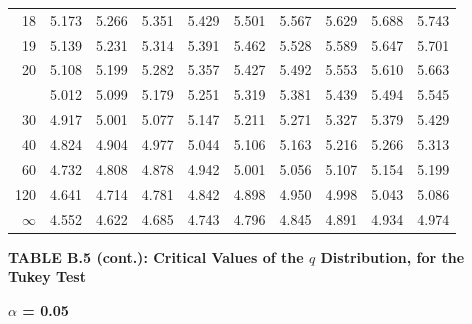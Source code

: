 \documentclass[10pt]{article}
\begin{document}
\begin{longtable}{@{}r!{\vrule width 0.8pt\hspace{0.55em}}rrrrrrrrr@{}}
18 & 5.173 & 5.266 & 5.351 & 5.429 & 5.501 & 5.567 & 5.629 & 5.688 & 5.743 \\
19 & 5.139 & 5.231 & 5.314 & 5.391 & 5.462 & 5.528 & 5.589 & 5.647 & 5.701 \\
20 & 5.108 & 5.199 & 5.282 & 5.357 & 5.427 & 5.492 & 5.553 & 5.610 & 5.663 \\
 & 5.012 & 5.099 & 5.179 & 5.251 & 5.319 & 5.381 & 5.439 & 5.494 & 5.545 \\
30 & 4.917 & 5.001 & 5.077 & 5.147 & 5.211 & 5.271 & 5.327 & 5.379 & 5.429 \\
40 & 4.824 & 4.904 & 4.977 & 5.044 & 5.106 & 5.163 & 5.216 & 5.266 & 5.313 \\
60 & 4.732 & 4.808 & 4.878 & 4.942 & 5.001 & 5.056 & 5.107 & 5.154 & 5.199 \\
120 & 4.641 & 4.714 & 4.781 & 4.842 & 4.898 & 4.950 & 4.998 & 5.043 & 5.086 \\
\addlinespace[0.30em]
$\infty$ & 4.552 & 4.622 & 4.685 & 4.743 & 4.796 & 4.845 & 4.891 & 4.934 & 4.974 \\
\end{longtable}
\newpage
\thispagestyle{empty}
\begin{center}
{\large\bfseries TABLE B.5 (cont.): Critical Values of the $q$ Distribution, for the Tukey Test\par}
\end{center}
{\large\bfseries $\alpha$ = 0.05\par}
\vspace{0.45em}
\small
\end{document}
